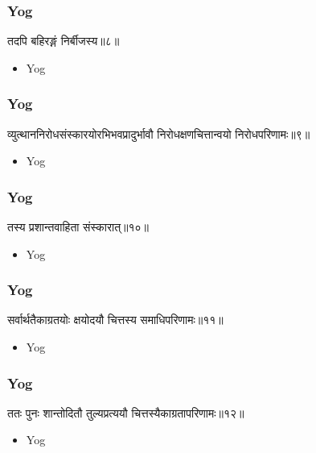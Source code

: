 \begin{frame}[fragile]\frametitle{Yog}
\begin{sanskrit}
तदपि बहिरङ्गं निर्बीजस्य॥८॥
\end{sanskrit}
	\begin{itemize}
	\item Yog 
	\end{itemize}
\end{frame}


\begin{frame}[fragile]\frametitle{Yog}
\begin{sanskrit}
व्युत्थाननिरोधसंस्कारयोरभिभवप्रादुर्भावौ निरोधक्षणचित्तान्वयो निरोधपरिणामः॥९॥
\end{sanskrit}
	\begin{itemize}
	\item Yog 
	\end{itemize}
\end{frame}

\begin{frame}[fragile]\frametitle{Yog}
\begin{sanskrit}
तस्य प्रशान्तवाहिता संस्कारात्॥१०॥
\end{sanskrit}
	\begin{itemize}
	\item Yog 
	\end{itemize}
\end{frame}



\begin{frame}[fragile]\frametitle{Yog}
\begin{sanskrit}
सर्वार्थतैकाग्रतयोः क्षयोदयौ चित्तस्य समाधिपरिणामः॥११॥
\end{sanskrit}
	\begin{itemize}
	\item Yog 
	\end{itemize}
\end{frame}


\begin{frame}[fragile]\frametitle{Yog}
\begin{sanskrit}
ततः पुनः शान्तोदितौ तुल्यप्रत्ययौ चित्तस्यैकाग्रतापरिणामः॥१२॥
\end{sanskrit}
	\begin{itemize}
	\item Yog 
	\end{itemize}
\end{frame}


